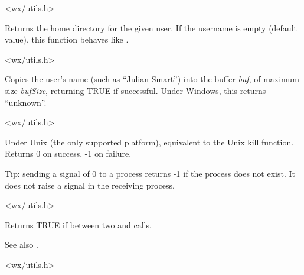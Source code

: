 
<wx/utils.h>

\label{wxgetuserhome}


Returns the home directory for the given user. If the username is empty
(default value), this function behaves like 
.


<wx/utils.h>



Copies the user's name (such as ``Julian Smart'') into the buffer {\it
buf}, of maximum size {\it bufSize}, returning TRUE if successful.
Under Windows, this returns ``unknown''.


<wx/utils.h>

\label{wxkill}


Under Unix (the only supported platform), equivalent to the Unix kill function.
Returns 0 on success, -1 on failure.

Tip: sending a signal of 0 to a process returns -1 if the process does not exist.
It does not raise a signal in the receiving process.


<wx/utils.h>

\label{wxisbusy}


Returns TRUE if between two  and\rtfsp
{} calls.

See also .


<wx/utils.h>

\label{wxloaduserresource}


